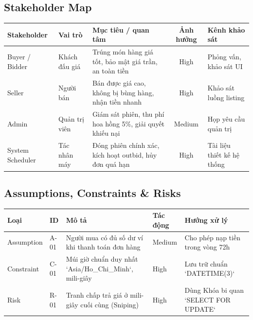 \documentclass[11pt,a4paper]{article}
\begin{document}
\subsection{Stakeholder Map}
\begin{table}[H]
    \centering
    \small
    \begin{tabularx}{\textwidth}{|l|l|X|c|l|}
        \hline
        \textbf{Stakeholder} & \textbf{Vai trò} & \textbf{Mục tiêu / quan tâm} & \textbf{Ảnh hưởng} & \textbf{Kênh khảo sát} \\ \hline
        Buyer / Bidder & Khách đấu giá & Trúng món hàng giá tốt, bảo mật giá trần, an toàn tiền & High & Phỏng vấn, khảo sát UI \\ \hline
        Seller & Người bán & Bán được giá cao, không bị bùng hàng, nhận tiền nhanh & High & Khảo sát luồng listing \\ \hline
        Admin & Quản trị viên & Giám sát phiên, thu phí hoa hồng 5\%, giải quyết khiếu nại & Medium & Họp yêu cầu quản trị \\ \hline
        System Scheduler & Tác nhân máy & Đóng phiên chính xác, kích hoạt outbid, hủy đơn quá hạn & High & Tài liệu thiết kế hệ thống \\ \hline
    \end{tabularx}
\end{table}

\subsection{Assumptions, Constraints \& Risks}
\begin{table}[H]
    \centering
    \small
    \begin{tabularx}{\textwidth}{|l|l|X|l|X|}
        \hline
        \textbf{Loại} & \textbf{ID} & \textbf{Mô tả} & \textbf{Tác động} & \textbf{Hướng xử lý} \\ \hline
        Assumption & A-01 & Người mua có đủ số dư ví khi thanh toán đơn hàng & Medium & Cho phép nạp tiền trong vòng 72h \\ \hline
        Constraint & C-01 & Múi giờ chuẩn duy nhất `Asia/Ho_Chi_Minh`, mili-giây & High & Lưu trữ chuẩn `DATETIME(3)` \\ \hline
        Risk & R-01 & Tranh chấp trả giá ở mili-giây cuối cùng (Sniping) & High & Dùng Khóa bi quan `SELECT FOR UPDATE` \\ \hline
    \end{tabularx}
\end{table}

\end{document}
